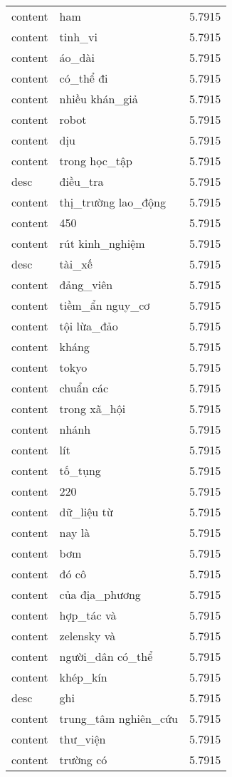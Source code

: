 \documentclass{article}
\begin{document}
\begin{tabular}{lll}
content & ham & 5.7915\\
content & tinh\_vi & 5.7915\\
content & áo\_dài & 5.7915\\
content & có\_thể đi & 5.7915\\
content & nhiều khán\_giả & 5.7915\\
content & robot & 5.7915\\
content & dịu & 5.7915\\
content & trong học\_tập & 5.7915\\
desc & điều\_tra & 5.7915\\
content & thị\_trường lao\_động & 5.7915\\
content & 450 & 5.7915\\
content & rút kinh\_nghiệm & 5.7915\\
desc & tài\_xế & 5.7915\\
content & đảng\_viên & 5.7915\\
content & tiềm\_ẩn nguy\_cơ & 5.7915\\
content & tội lừa\_đảo & 5.7915\\
content & kháng & 5.7915\\
content & tokyo & 5.7915\\
content & chuẩn các & 5.7915\\
content & trong xã\_hội & 5.7915\\
content & nhánh & 5.7915\\
content & lít & 5.7915\\
content & tố\_tụng & 5.7915\\
content & 220 & 5.7915\\
content & dữ\_liệu từ & 5.7915\\
content & nay là & 5.7915\\
content & bơm & 5.7915\\
content & đó cô & 5.7915\\
content & của địa\_phương & 5.7915\\
content & hợp\_tác và & 5.7915\\
content & zelensky và & 5.7915\\
content & người\_dân có\_thể & 5.7915\\
content & khép\_kín & 5.7915\\
desc & ghi & 5.7915\\
content & trung\_tâm nghiên\_cứu & 5.7915\\
content & thư\_viện & 5.7915\\
content & trường có & 5.7915\\

\end{tabular}
\end{document}
